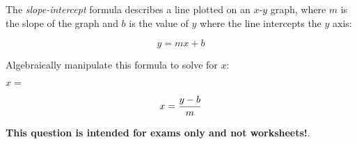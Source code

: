 

The {\it slope-intercept} formula describes a line plotted on an $x$-$y$ graph, where $m$ is the slope of the graph and $b$ is the value of $y$ where the line intercepts the $y$ axis:

$$y = mx + b$$

Algebraically manipulate this formula to solve for $x$:

\vskip 20pt

$x = $







$$x = {y - b \over m}$$







{\bf This question is intended for exams only and not worksheets!}.



